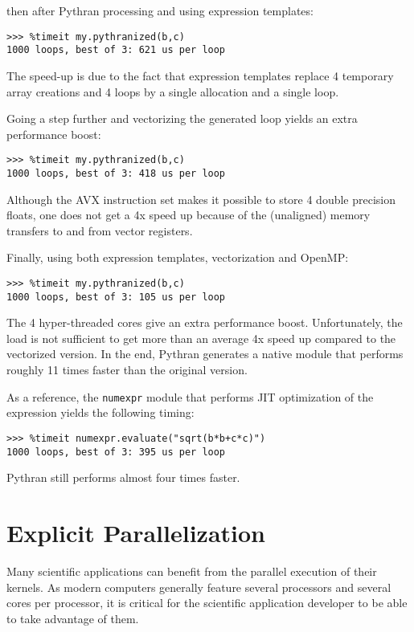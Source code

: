 \documentclass[10pt, onecolumn, preprint]{sigplanconf}
\begin{document}
\noindent then after Pythran processing and using expression templates:

\begin{lstlisting}
>>> %timeit my.pythranized(b,c)
1000 loops, best of 3: 621 us per loop
\end{lstlisting}

The speed-up is due to the fact that expression templates replace 4 temporary
array creations and 4 loops by a single allocation and a single loop.

Going a step further and vectorizing the generated loop yields an extra
performance boost:

\begin{lstlisting}
>>> %timeit my.pythranized(b,c)
1000 loops, best of 3: 418 us per loop
\end{lstlisting}

Although the AVX instruction set makes it possible to store 4 double precision
floats, one does not get a 4x speed up because of the (unaligned) memory transfers
to and from vector registers.

Finally, using both expression templates, vectorization and OpenMP:

\begin{lstlisting}
>>> %timeit my.pythranized(b,c)
1000 loops, best of 3: 105 us per loop
\end{lstlisting}

The 4 hyper-threaded cores give an extra performance boost. Unfortunately, the
load is not sufficient to get more than an average 4x speed up compared to the
vectorized version. In the end, Pythran generates a native module that performs
roughly 11 times faster than the original version.

As a reference, the \texttt{numexpr} module that performs JIT optimization of the
expression yields the following timing:

\begin{lstlisting}
>>> %timeit numexpr.evaluate("sqrt(b*b+c*c)")
1000 loops, best of 3: 395 us per loop
\end{lstlisting}

\noindent Pythran still performs almost four times faster.

\section{Explicit Parallelization}
\label{sec:openmp}

Many scientific applications can benefit from the parallel execution of their
kernels. As modern computers generally feature several processors and several
cores per processor, it is critical for the scientific application developer to
be able to take advantage of them.
\end{document}
